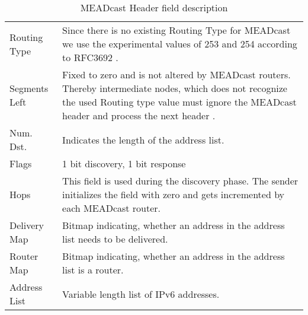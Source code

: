 \bgroup
\begin{table}[h!]
\centering
\def\arraystretch{1.5}%
\setlength{\tabcolsep}{1.2em}
\begin{tabularx}{\textwidth}{lX}
Routing Type  & Since there is no existing Routing Type for MEADcast we use the
                experimental values of 253 and 254 according to RFC3692
                \cite{rfc3692_ipv6_rt_type}.\\
Segments Left & Fixed to zero and is not altered by MEADcast routers. Thereby
                intermediate nodes, which does not recognize the used Routing
                type value must ignore the MEADcast header and process the next
                header \cite{rfc8200_ipv6_hdr}.\\
Num. Dst.     & Indicates the length of the address list. \\
Flags         & 1 bit discovery, 1 bit response        \\
Hops          & This field is used during the discovery phase. The sender
                initializes the field with zero and gets incremented by each
                MEADcast router. \\
Delivery Map  & Bitmap indicating, whether an address in the address list needs
                to be delivered.\\
Router Map    & Bitmap indicating, whether an address in the address list is a
                router.\\
Address List  & Variable length list of IPv6 addresses. \\
\end{tabularx}
\caption{MEADcast Header field description}
\label{tab:my-table}
\end{table}
\egroup

